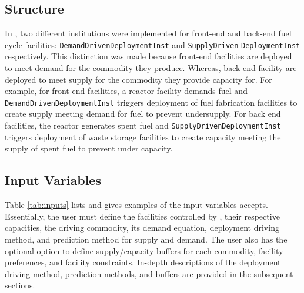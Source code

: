 \subsection{Structure}
In \deploy, two different institutions were implemented for 
front-end and back-end fuel cycle facilities: 
\texttt{DemandDrivenDeploymentInst} and 
\texttt{SupplyDriven} 
\noindent
\texttt{DeploymentInst} respectively. 
This distinction was made because front-end facilities 
are deployed to meet demand for the commodity they produce. 
Whereas, back-end facility are deployed to meet supply for the 
commodity they provide capacity for. 
For example, for front end facilities, a reactor facility 
demands fuel and \texttt{DemandDrivenDeploymentInst} 
triggers deployment of fuel fabrication facilities to create 
supply meeting demand for fuel to prevent undersupply. 
For back end facilities, the reactor generates spent fuel and 
\texttt{SupplyDrivenDeploymentInst} triggers deployment of 
waste storage facilities to create capacity meeting the supply 
of spent fuel to prevent under capacity. 

\subsection{Input Variables}
Table \ref{tab:inputs} lists and gives examples of the input 
variables \deploy accepts. 
Essentially, the user must define the facilities controlled by 
\deploy, their respective capacities, the driving commodity, 
its demand equation, deployment driving method, and prediction method 
for supply and demand. 
The user also has the optional option to define supply/capacity buffers 
for each commodity, facility preferences, and facility constraints. 
In-depth descriptions of the deployment driving method, prediction 
methods, and buffers are provided in the subsequent sections. 


